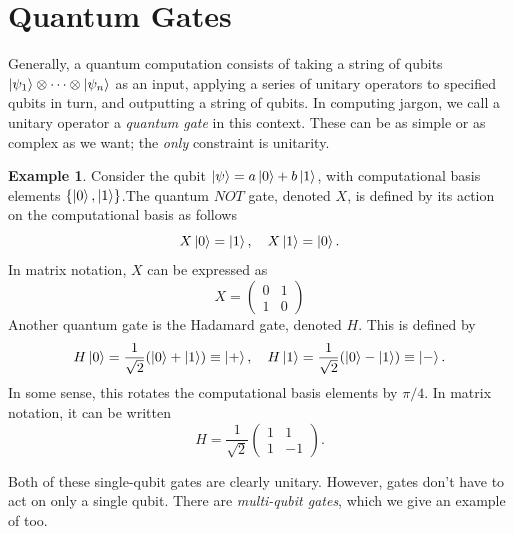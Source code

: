 \documentclass[12pt,a4paper]{report}
\numberwithin{equation}{section}
\theoremstyle{definition}
\theoremstyle{theorem}
\theoremstyle{theorem}
\theoremstyle{example}
\newtheorem{example}{Example}[section]
\theoremstyle{definition}
\begin{document}
\section{Quantum Gates}
Generally, a quantum computation consists of taking a string of qubits $\ket{\psi_{1}}\otimes\cdots\otimes\ket{\psi_{n}}$ as an input, applying a series of unitary operators to specified qubits in turn, and outputting a string of qubits. In computing jargon, we call a unitary operator a \textit{quantum gate} in this context. These can be as simple or as complex as we want; the \textit{only} constraint is unitarity.
\begin{example}
	Consider the qubit $\ket{\psi}=a\ket{0}+b\ket{1}$, with computational basis elements $\{\ket{0},\ket{1}\}$.The quantum $NOT$ gate, denoted $X$, is defined by its action on the computational basis as follows
	\begin{equation}
		X\ket{0}=\ket{1},\quad X\ket{1}=\ket{0}.
	\end{equation}
	In matrix notation, $X$ can be expressed as
	\begin{equation}
		X=\begin{pmatrix}
			0&1\\1&0
		\end{pmatrix}
	\end{equation}
	Another quantum gate is the Hadamard gate, denoted $H$. This is defined by
	\begin{equation}
		H\ket{0}=\frac{1}{\sqrt{2}}(\ket{0}+\ket{1})\equiv\ket{+},\quad H\ket{1}=\frac{1}{\sqrt{2}}(\ket{0}-\ket{1})\equiv\ket{-}.
	\end{equation}
	In some sense, this rotates the computational basis elements by $\pi/4$. In matrix notation, it can be written
	\begin{equation}
		H=\frac{1}{\sqrt{2}}\begin{pmatrix}
			1&1\\1&-1
		\end{pmatrix}.
	\end{equation}
\end{example}
Both of these single-qubit gates are clearly unitary. However, gates don't have to act on only a single qubit. There are \textit{multi-qubit gates}, which we give an example of too.
\end{document}
